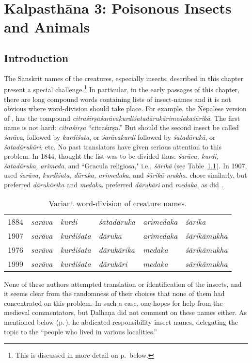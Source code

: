 \chapter{Kalpasthāna 3: Poisonous Insects and Animals}


\section{Introduction}

The Sanskrit names of the creatures, especially insects, described in
this chapter present a special challenge.\footnote{This is discussed
    in more detail on p.\,\pageref{insectnames} below.}  In particular, in
    the early passages of this chapter, there are long compound words
    containing lists of insect-names and it is not obvious where
    word-division should take place.  For example, the Nepalese version of
    , has the compound
    \emph{citra\-śīrṣa\-śarāva\-kurdi\-śata\-dāru\-kāri\-medaka\-śārikā}.
    The first name is not hard: \emph{citraśīrṣa} “\Gls{citraśīrṣa}.”  But
    should the second insect be called \emph{śarāva}, followed by
    \emph{kurdiśata}, or \emph{śarāvakurdi} followed by \emph{śatadārukā},
    or \emph{śatadārukāri}, etc.  No past translators have given serious
    attention to this problem.  In 1844, \citet[219]{hess-1855} thought
    the list was to be divided thus: \emph{śarāva, kurdi, śatadāruka,
        arimeda}, and “Gracula religiosa," i.e., \emph{śārikā}  (see 
        Table~\ref{worddivision}). 
    In 1907, \citet[v.\,2, 696]{bhis-1907} used \emph{śarāva,
        kurdiśata, dāruka, arimedaka}, and \emph{śārikā-mukha}. 
    \citet[56]{sing-1976} chose similarly, but preferred
    \emph{dārukārika} and \emph{medaka}. \citet[v.\,3, 27]{shar-1999}
    preferred \emph{dārukāri} and \emph{medaka}, as did
    \citet[608]{vali-2007}.
\begin{table}
    \centering
        \begin{tabular}{l>{\em}l>{\em}l>{\em}l>{\em}l>{\em}l}
        \toprule
        1884 & sarāva & kurdi & śatadāruka & arimedaka & śārika \\      
        1907 & sarāva & kurdiśata & dāruka & arimedaka & śārikāmukha \\
        1976 & sarāva & kurdiśata & dārukārika & medaka & śārikāmukha \\
        1999 & sarāva & kurdiśata & dārukāri & medaka & sārikāmukha \\
        \bottomrule 
    \end{tabular}        
    \caption{Variant word-division of creature names.}
    \label{worddivision}
\end{table}    
    None of these authors attempted
    translation or identification of the insects, and it seems clear
    from the randomness of their choices that none of them had
    concentrated on this problem.  In such a case, one hopes for help
    from the medieval commentators, but Ḍalhaṇa did not comment on
    these names either.  As mentioned below
    (p.\,\pageref{insectnames}), he abdicated responsibility insect
    names, delegating the topic to the “people who lived in various
    localities.”
    
